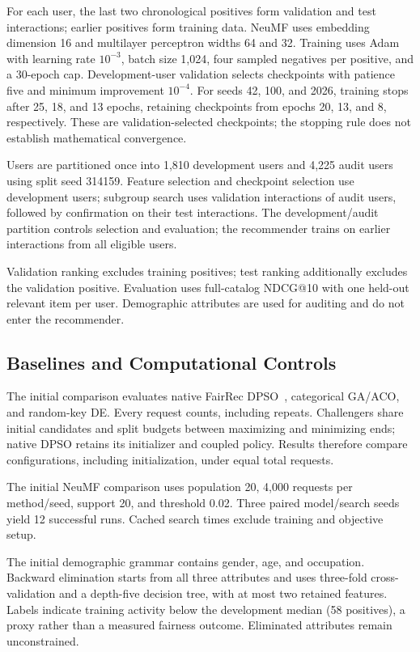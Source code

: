 For each user, the last two chronological positives form validation and test interactions; earlier positives form training data. NeuMF uses embedding dimension 16 and multilayer perceptron widths 64 and 32. Training uses Adam with learning rate $10^{-3}$, batch size 1,024, four sampled negatives per positive, and a 30-epoch cap. Development-user validation selects checkpoints with patience five and minimum improvement $10^{-4}$. For seeds 42, 100, and 2026, training stops after 25, 18, and 13 epochs, retaining checkpoints from epochs 20, 13, and 8, respectively. These are validation-selected checkpoints; the stopping rule does not establish mathematical convergence.

Users are partitioned once into 1,810 development users and 4,225 audit users using split seed 314159. Feature selection and checkpoint selection use development users; subgroup search uses validation interactions of audit users, followed by confirmation on their test interactions. The development/audit partition controls selection and evaluation; the recommender trains on earlier interactions from all eligible users.

Validation ranking excludes training positives; test ranking additionally excludes the validation positive. Evaluation uses full-catalog NDCG@10 with one held-out relevant item per user. Demographic attributes are used for auditing and do not enter the recommender.

\subsection{Baselines and Computational Controls}
The initial comparison evaluates native FairRec DPSO~\cite{guo2023fairrec}, categorical GA/ACO, and random-key DE. Every request counts, including repeats. Challengers share initial candidates and split budgets between maximizing and minimizing ends; native DPSO retains its initializer and coupled policy. Results therefore compare configurations, including initialization, under equal total requests.

The initial NeuMF comparison uses population 20, 4,000 requests per method/seed, support 20, and threshold 0.02. Three paired model/search seeds yield 12 successful runs. Cached search times exclude training and objective setup.

The initial demographic grammar contains gender, age, and occupation. Backward elimination starts from all three attributes and uses three-fold cross-validation and a depth-five decision tree, with at most two retained features. Labels indicate training activity below the development median (58 positives), a proxy rather than a measured fairness outcome. Eliminated attributes remain unconstrained.

